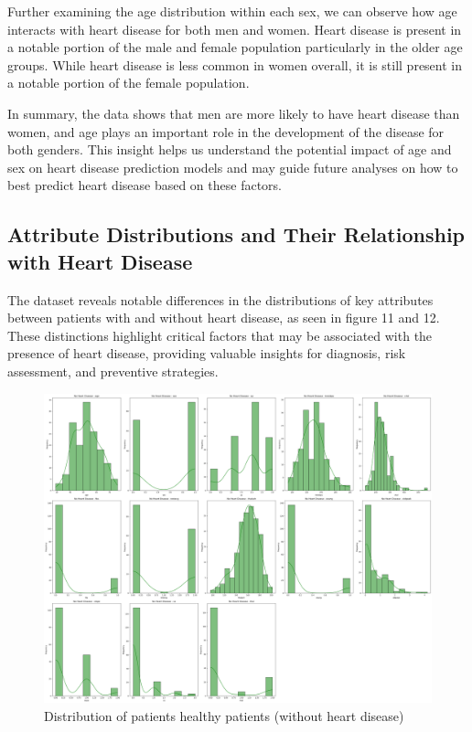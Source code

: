 Further examining the age distribution within each sex, we can observe how age interacts with heart disease for both men and women. Heart disease is present in a notable portion of the male and female population particularly in the older age groups. While heart disease is less common in women overall, it is still present in a notable portion of the female population.

In summary, the data shows that men are more likely to have heart disease than women, and age plays an important role in the development of the disease for both genders. This insight helps us understand the potential impact of age and sex on heart disease prediction models and may guide future analyses on how to best predict heart disease based on these factors.

\subsection{Attribute Distributions and Their Relationship with Heart Disease} 

The dataset reveals notable differences in the distributions of key attributes between patients with and without heart disease, as seen in figure 11 and 12. These distinctions highlight critical factors that may be associated with the presence of heart disease, providing valuable insights for diagnosis, risk assessment, and preventive strategies.

\begin{figure}[!htb]
    \centering
    \includegraphics[width=1\linewidth]{images/no_heart_distribution.png}
    \caption{Distribution of patients healthy patients (without heart disease)}
    \label{fig:no_heart_distribution}
\end{figure}

